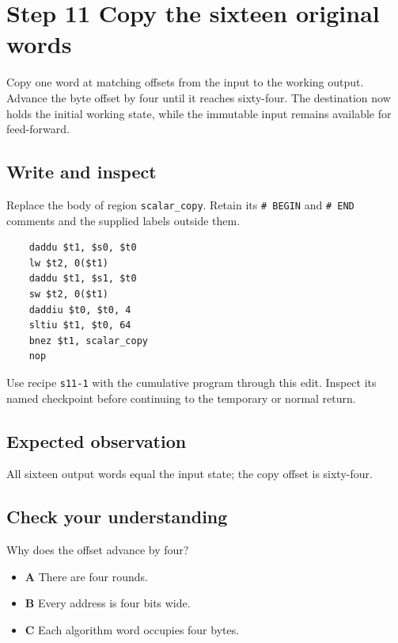 \section{Step 11 Copy the sixteen original words}\label{chacha-s11}

Copy one word at matching offsets from the input to the working output. Advance the byte offset by four until it reaches sixty-four. The destination now holds the initial working state, while the immutable input remains available for feed-forward.

\subsection{Write and inspect}
Replace the body of region \texttt{scalar\_copy}. Retain its \texttt{\# BEGIN} and \texttt{\# END} comments and the supplied labels outside them.

\begin{verbatim}
    daddu $t1, $s0, $t0
    lw $t2, 0($t1)
    daddu $t1, $s1, $t0
    sw $t2, 0($t1)
    daddiu $t0, $t0, 4
    sltiu $t1, $t0, 64
    bnez $t1, scalar_copy
    nop
\end{verbatim}

Use recipe \texttt{s11-1} with the cumulative program through this edit. Inspect its named checkpoint before continuing to the temporary or normal return.

\subsection{Expected observation}
All sixteen output words equal the input state; the copy offset is sixty-four.

\subsection{Check your understanding}
Why does the offset advance by four?

\begin{itemize}
\item \textbf{A} There are four rounds.
\item \textbf{B} Every address is four bits wide.
\item \textbf{C} Each algorithm word occupies four bytes.
\end{itemize}
